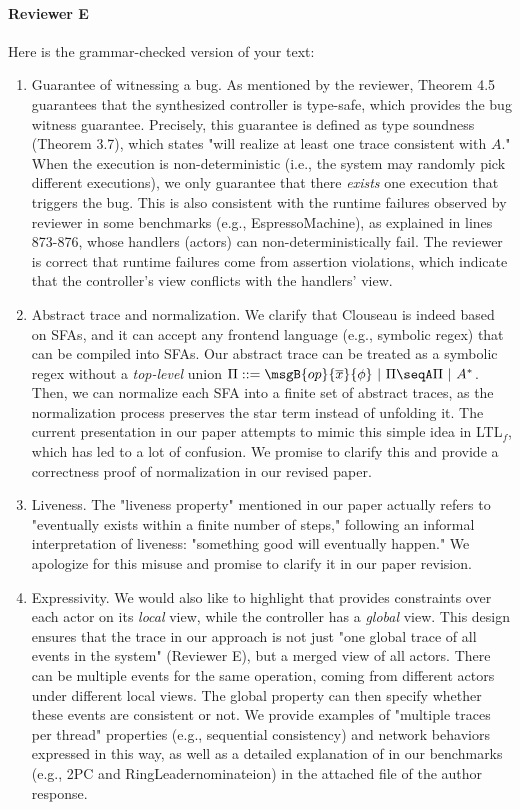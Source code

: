 \paragraph{Reviewer E}

Here is the grammar-checked version of your text:

\begin{enumerate}
    \item Guarantee of witnessing a bug. As mentioned by the reviewer, Theorem 4.5 guarantees that the synthesized controller is type-safe, which provides the bug witness guarantee. Precisely, this guarantee is defined as type soundness (Theorem 3.7), which states "will realize at least one trace consistent with $A$." When the execution is non-deterministic (i.e., the system may randomly pick different executions), we only guarantee that there \emph{exists} one execution that triggers the bug. This is also consistent with the runtime failures observed by reviewer in some benchmarks (e.g., EspressoMachine), as explained in lines 873-876, whose handlers (actors) can non-deterministically fail. The reviewer is correct that runtime failures come from assertion violations, which indicate that the controller's view conflicts with the handlers' view.
    \item Abstract trace and normalization. We clarify that {\sf Clouseau} is indeed based on SFAs, and it can accept any frontend language (e.g., symbolic regex) that can be compiled into SFAs. Our abstract trace can be treated as a symbolic regex without a \emph{top-level} union $\Pi ::= \msgB{op}{\overline{x}}{\phi} ~|~ \Pi \seqA \Pi ~|~ A^*$. Then, we can normalize each SFA into a finite set of abstract traces, as the normalization process preserves the star term instead of unfolding it. The current presentation in our paper attempts to mimic this simple idea in LTL$_f$, which has led to a lot of confusion. We promise to clarify this and provide a correctness proof of normalization in our revised paper.
    \item Liveness. The "liveness property" mentioned in our paper actually refers to "eventually exists within a finite number of steps," following an informal interpretation of liveness: "something good will eventually happen." We apologize for this misuse and promise to clarify it in our paper revision.
    \item Expressivity. We would also like to highlight that \PAT provides constraints over each actor on its \emph{local} view, while the controller has a \emph{global} view. This design ensures that the trace in our approach is not just "one global trace of all events in the system" (Reviewer E), but a merged view of all actors. There can be multiple events for the same operation, coming from different actors under different local views. The global property can then specify whether these events are consistent or not. We provide \PAT examples of "multiple traces per thread" properties (e.g., sequential consistency) and network behaviors expressed in this way, as well as a detailed explanation of \PAT in our benchmarks (e.g., 2PC and RingLeadernominateion) in the attached file of the author response.

\end{enumerate}
